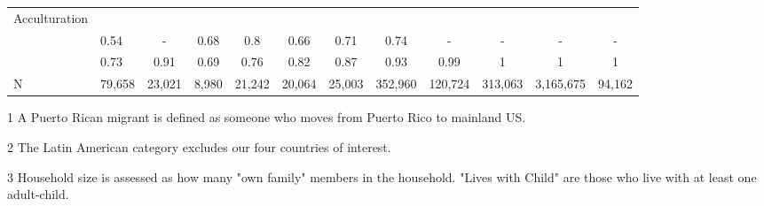 \documentclass[
]{article}
\begin{document}
\begin{landscape}
\begin{table}[ht]
\begin{threeparttable}
\begin{tabular}{>{\raggedright\arraybackslash}p{3.2cm}|lcccccc|cccc}
  Acculturation &  &  &  &  &  &  &  &  &  &  &  \\ 
  \multicolumn{1}{>{\raggedleft\arraybackslash}p{1.6cm}|}{\makebox[1.6cm][r]{Citizen }}& 0.54 & - & 0.68 & 0.8 & 0.66 & 0.71 & 0.74 & - & - & - & - \\ 
  \multicolumn{1}{>{\raggedleft\arraybackslash}p{3cm}|}{\makebox[3cm][r]{English Speakers }}& 0.73 & 0.91 & 0.69 & 0.76 & 0.82 & 0.87 & 0.93 & 0.99 & 1 & 1 & 1 \\ 
    \hline
  N & 79,658 & 23,021 & 8,980 & 21,242 & 20,064 & 25,003 & 352,960 & 120,724 & 313,063 & 3,165,675 & 94,162 \\ 
   \hline
\end{tabular}
\endgroup
\begin{tablenotes}
\item[1] A Puerto Rican migrant is defined as someone who moves from Puerto Rico to mainland US.
\item[2] The Latin American category excludes our four countries of interest.
\item[3] Household size is assessed as how many "own family" members in the household. "Lives with Child" are those who live with at least one adult-child.
\end{tablenotes}
\end{threeparttable}
\end{table}



\end{landscape}
\end{document}
